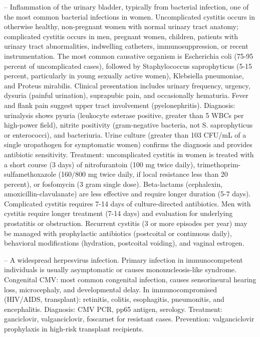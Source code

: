 -- Inflammation of the urinary bladder, typically from bacterial infection, one of the most common bacterial infections in women. Uncomplicated cystitis occurs in otherwise healthy, non-pregnant women with normal urinary tract anatomy; complicated cystitis occurs in men, pregnant women, children, patients with urinary tract abnormalities, indwelling catheters, immunosuppression, or recent instrumentation. The most common causative organism is Escherichia coli (75-95 percent of uncomplicated cases), followed by Staphylococcus saprophyticus (5-15 percent, particularly in young sexually active women), Klebsiella pneumoniae, and Proteus mirabilis. Clinical presentation includes urinary frequency, urgency, dysuria (painful urination), suprapubic pain, and occasionally hematuria. Fever and flank pain suggest upper tract involvement (pyelonephritis). Diagnosis: urinalysis shows pyuria (leukocyte esterase positive, greater than 5 WBCs per high-power field), nitrite positivity (gram-negative bacteria, not S. saprophyticus or enterococci), and bacteriuria. Urine culture (greater than 103 CFU/mL of a single uropathogen for symptomatic women) confirms the diagnosis and provides antibiotic sensitivity. Treatment: uncomplicated cystitis in women is treated with a short course (3 days) of nitrofurantoin (100 mg twice daily), trimethoprim-sulfamethoxazole (160/800 mg twice daily, if local resistance less than 20 percent), or fosfomycin (3 gram single dose). Beta-lactams (cephalexin, amoxicillin-clavulanate) are less effective and require longer duration (5-7 days). Complicated cystitis requires 7-14 days of culture-directed antibiotics. Men with cystitis require longer treatment (7-14 days) and evaluation for underlying prostatitis or obstruction. Recurrent cystitis (3 or more episodes per year) may be managed with prophylactic antibiotics (postcoital or continuous daily), behavioral modifications (hydration, postcoital voiding), and vaginal estrogen.

-- A widespread herpesvirus infection. Primary infection in immunocompetent individuals is usually asymptomatic or causes mononucleosis-like syndrome. Congenital CMV: most common congenital infection, causes sensorineural hearing loss, microcephaly, and developmental delay. In immunocompromised (HIV/AIDS, transplant): retinitis, colitis, esophagitis, pneumonitis, and encephalitis. Diagnosis: CMV PCR, pp65 antigen, serology. Treatment: ganciclovir, valganciclovir, foscarnet for resistant cases. Prevention: valganciclovir prophylaxis in high-risk transplant recipients.

